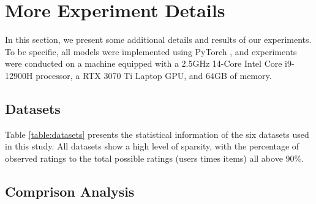 \documentclass{article} %
\begin{document}
\section{More Experiment Details}

In this section, we present some additional details and results of our experiments. 
To be specific, all models were implemented using PyTorch \citep{paszke2019pytorch}, and experiments were conducted on a machine equipped with a 2.5GHz 14-Core Intel Core i9-12900H processor, a RTX 3070 Ti Laptop GPU, and 64GB of memory.

\begin{table}[!htbp]
\centering
    \caption{
        The statistic information of the datasets used in the research.
        \#Ratings is the number of the observed ratings; 
        \#Users is the number of users; 
        \#Items is the number of items; 
        Sparsity is percentage of \#Ratings in (\#Users $\times$ \#Items).
    }
    \label{table:datasets}
\end{table}


\subsection{Datasets}

Table \ref{table:datasets} presents the statistical information of the six datasets used in this study.
All datasets show a high level of sparsity, with the percentage of observed ratings to the total possible ratings (users times items) all above 90\%. 

\subsection{Comprison Analysis}
\end{document}
